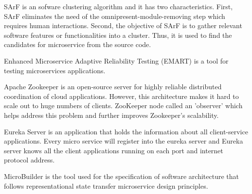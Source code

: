 SArF is an sofware clustering algorithm and it has two characteristics. First, SArF eliminates the need of the omnipresent-module-removing step which requires human interactions. Second, the objective of SArF is to gather relevant software features or functionalities into a cluster. Thus, it is used to find the candidates for microservice from the source code.\cite{Kamimura2018}

Enhanced Microservice Adaptive Reliability Testing (EMART) is a tool for testing microservices applications.\cite{Russo2020}

Apache Zookeeper is an open-source server for highly reliable distributed coordination of cloud applications. However, this architecture makes it hard to scale out to huge numbers of clients. ZooKeeper node called an 'observer' which helps address this problem and further improves Zookeeper's scalability.\cite{Kalske2017paper, KalskeM2017}

Eureka Server is an application that holds the information about all client-service applications. Every micro service will register into the eureka server and Eureka server knows all the client applications running on each port and internet protocol address.\cite{Uber}

MicroBuilder is the tool used for the specification of software architecture that follows representational state transfer microservice design principles.\cite{Branko2018} 


